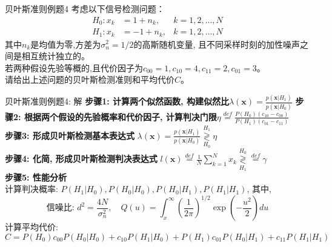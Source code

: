 \begin{frame}{贝叶斯准则例题4}
考虑以下信号检测问题：
\begin{align*}
H_0: x_k&=1+n_{k},   & k=1,2,\dots,N\\
H_1: x_k&=-1+n_{k}, & k=1,2,\dots,N
\end{align*}
其中$n_{k}$是均值为零,方差为$\sigma_n^2=1/2$的高斯随机变量,  且不同采样时刻的加性噪声之间是相互统计独立的。\\
若两种假设先验等概的,且代价因子为$c_{00}=1, c_{10}=4, c_{11}=2, c_{01}=3$。\\
请给出上述问题的贝叶斯检测准则和平均代价$C$。
\end{frame}

\begin{frame}[shrink]{贝叶斯准则例题4: 解}
\textbf{步骤1: 计算两个似然函数, 构建似然比}$\lambda(\bm{x})=\frac{p(\bm{x}|H_1)}{p(\bm{x}|H_0)}$
\textbf{步骤2: 根据两个假设的先验概率和代价因子, 计算判决门限}$\eta\mathop{=}\limits^{def}\frac{P(H_0)(c_{10}-c_{00})}{P(H_1)(c_{01}-c_{11})}$\\
\textbf{步骤3: 形成贝叶斯检测基本表达式}
$\lambda(\bm{x})=\frac{p(\bm{x}|H_1)}{p(\bm{x}|H_0)}\mathop{\gtrless}\limits_{H_0}^{H_1}\eta$\\
\textbf{步骤4: 化简, 形成贝叶斯检测判决表达式}
$l(\bm{x})\mathop{=}\limits^{def}\frac{1}{N}\sum\limits_{k=1}^{N}x_k\mathop{\gtrless}\limits_{H_1}^{H_0}\mathop{=}\limits^{def}\gamma$\\
\textbf{步骤5: 性能分析}\\
计算判决概率: $P(H_1|H_0),P(H_0|H_0),P(H_0|H_1),P(H_1|H_1)$, 其中,\\
\[\text{信噪比: }d^2=\frac{4N}{\sigma_n^2},\quad Q(u)=\int_{x}^{\infty}\left(\frac{1}{2\pi}\right)^{1/2}\exp\left(-\frac{u^2}{2}\right)du\]
计算平均代价:\\
$C=P(H_0)c_{00}P(H_0|H_0)+c_{10}P(H_1|H_0)+P(H_1)c_{01}P(H_0|H_1)+c_{11}P(H_1|H_1)$
\end{frame}




